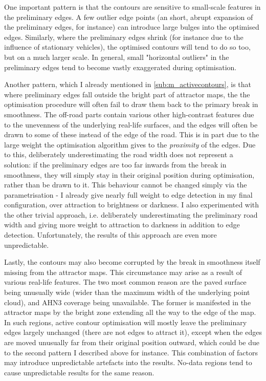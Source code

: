 One important pattern is that the contours are sensitive to small-scale features in the preliminary edges. A few outlier edge points (an short, abrupt expansion of the preliminary edges, for instance) can introduce large bulges into the optimised edges. Similarly, where the preliminary edges shrink (for instance due to the influence of stationary vehicles), the optimised contours will tend to do so too, but on a much larger scale. In general, small "horizontal outliers" in the preliminary edges tend to become vastly exaggerated during optimisation.

Another pattern, which I already mentioned in \ref{sub:m_activecontours}, is that where preliminary edges fall outside the bright part of attractor maps, the the optimisation procedure will often fail to draw them back to the primary break in smoothness. The off-road parts contain various other high-contrast features due to the unevenness of the underlying real-life surfaces, and the edges will often be drawn to some of these instead of the edge of the road. This is in part due to the large weight the optimisation algorithm gives to the \textit{proximity} of the edges. Due to this, deliberately underestimating the road width does not represent a solution: if the preliminary edges are too far inwards from the break in smoothness, they will simply stay in their original position during optimisation, rather than be drawn to it. This behaviour cannot be changed simply via the parametrisation - I already give nearly full weight to edge detection in my final configuration, over attraction to brightness or darkness. I also experimented with the other trivial approach, i.e. deliberately underestimating the preliminary road width and giving more weight to attraction to darkness in addition to edge detection. Unfortunately, the results of this approach are even more unpredictable.

Lastly, the contours may also become corrupted by the break in smoothness itself missing from the attractor maps. This circumstance may arise as a result of various real-life features. The two most common reason are the paved surface being unusually wide (wider than the maximum width of the underlying point cloud), and AHN3 coverage being unavailable. The former is manifested in the attractor maps by the bright zone extending all the way  to the edge of the map. In such regions, active contour optimisation will mostly leave the preliminary edges largely unchanged (there are not edges to attract it), except when the edges are moved unusually far from their original position outward, which could be due to the second pattern I described above for instance. This combination of factors may introduce unpredictable artefacts into the results. No-data regions tend to cause unpredictable results for the same reason.

